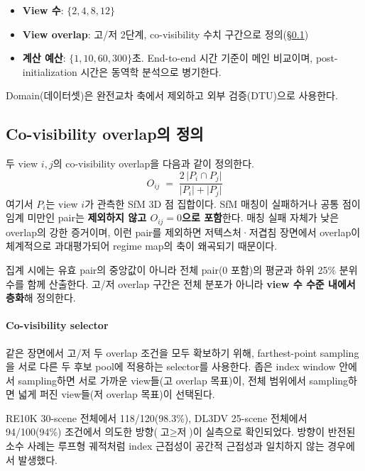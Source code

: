 \begin{itemize}
  \item \textbf{View 수}: $\{2, 4, 8, 12\}$
  \item \textbf{View overlap}: 고/저 2단계, co-visibility 수치 구간으로 정의(\S\ref{sec:overlap})
  \item \textbf{계산 예산}: $\{1, 10, 60, 300\}$초. End-to-end 시간 기준이 메인 비교이며, post-initialization 시간은 동역학 분석으로 병기한다.
\end{itemize}

Domain(데이터셋)은 완전교차 축에서 제외하고 외부 검증(DTU)으로 사용한다.

\subsection{Co-visibility overlap의 정의}
\label{sec:overlap}

두 view $i, j$의 co-visibility overlap을 다음과 같이 정의한다.
\begin{equation}
O_{ij} \;=\; \frac{2\,\lvert P_i \cap P_j \rvert}{\lvert P_i \rvert + \lvert P_j \rvert}
\label{eq:overlap}
\end{equation}
여기서 $P_i$는 view $i$가 관측한 SfM 3D 점 집합이다. SfM 매칭이 실패하거나 공통 점이 임계 미만인 pair는 \textbf{제외하지 않고 $O_{ij} = 0$으로 포함}한다. 매칭 실패 자체가 낮은 overlap의 강한 증거이며, 이런 pair를 제외하면 저텍스처·저겹침 장면에서 overlap이 체계적으로 과대평가되어 regime map의 축이 왜곡되기 때문이다.

집계 시에는 유효 pair의 중앙값이 아니라 전체 pair(0 포함)의 평균과 하위 25\% 분위수를 함께 산출한다. 고/저 overlap 구간은 전체 분포가 아니라 \textbf{view 수 수준 내에서 층화}해 정의한다.

\paragraph{Co-visibility selector} 같은 장면에서 고/저 두 overlap 조건을 모두 확보하기 위해, farthest-point sampling을 서로 다른 두 후보 pool에 적용하는 selector를 사용한다. 좁은 index window 안에서 sampling하면 서로 가까운 view들(고 overlap 목표)이, 전체 범위에서 sampling하면 넓게 퍼진 view들(저 overlap 목표)이 선택된다.

RE10K 30-scene 전체에서 118/120(98.3\%), DL3DV 25-scene 전체에서 94/100(94\%) 조건에서 의도한 방향($\text{고} \ge \text{저}$)이 실측으로 확인되었다. 방향이 반전된 소수 사례는 루프형 궤적처럼 index 근접성이 공간적 근접성과 일치하지 않는 경우에서 발생했다.

